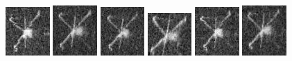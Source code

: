 \begin{figure}
    \includegraphics[width=0.15\textwidth]{chapters/images/dataset/all-class-images/valve/valve-109.jpg}
    \includegraphics[width=0.15\textwidth]{chapters/images/dataset/all-class-images/valve/valve-135.jpg}
    \includegraphics[width=0.15\textwidth]{chapters/images/dataset/all-class-images/valve/valve-117.jpg}
    \includegraphics[width=0.15\textwidth]{chapters/images/dataset/all-class-images/valve/valve-167.jpg}    
    \includegraphics[width=0.15\textwidth]{chapters/images/dataset/all-class-images/valve/valve-111.jpg}
    \includegraphics[width=0.15\textwidth]{chapters/images/dataset/all-class-images/valve/valve-142.jpg}
    

\end{figure}
